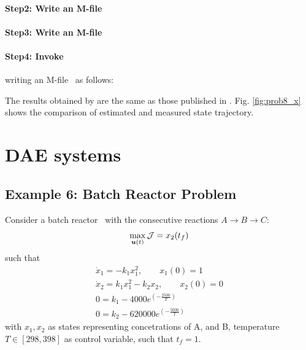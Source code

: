 \paragraph{Step2: Write an M-file~}

{\small }

\paragraph{Step3: Write an M-file~}

{\small }

\paragraph{Step4: Invoke~} writing an
M-file~ as follows:

{\small }

The results obtained by  are the same as those published
in \cite{fik02}. Fig. \ref{fig:prob8_x} shows the comparison of
estimated and measured state trajectory. 

\section{DAE systems}
\label{sec:daes}

\subsection{Example 6: Batch Reactor Problem}
\label{sec:brpdae}

Consider a batch reactor~\citep{raj01,dad95} with the 
consecutive reactions $A \rightarrow B\rightarrow C$:
\begin{equation}
\max_{\ve{u}(t)} \mf{J} = x_{2}(t_{f}) \label{eq:batch_dae}
\end{equation}
such that
\begin{gather}
\dot{x}_{1} = -k_{1}x_{1}^{2}, \qquad x_1(0) = 1 \\
\dot{x}_{2} = k_{1}x_{1}^{2} - k_{2}x_{2}, \qquad x_2(0) = 0 \\
0 = k_{1} - 4000e^{(-\frac{2500}{T})} \\
0 = k_{2} - 620000e^{(-\frac{5000}{T})} 
\end{gather} with $x_{1}, x_{2}$ as states representing concetrations
of A, and B, temperature $T \in [298,398]$ as control variable, such
that $t_{f} = 1$.

